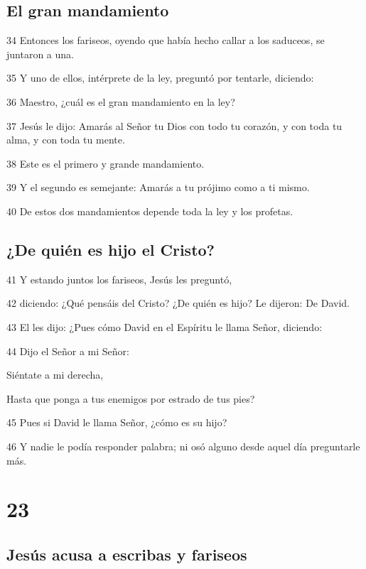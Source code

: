 \section*{El gran mandamiento}

\par 34 Entonces los fariseos, oyendo que había hecho callar a los saduceos, se juntaron a una.
\par 35 Y uno de ellos, intérprete de la ley, preguntó por tentarle, diciendo:
\par 36 Maestro, ¿cuál es el gran mandamiento en la ley?
\par 37 Jesús le dijo: Amarás al Señor tu Dios con todo tu corazón, y con toda tu alma, y con toda tu mente.
\par 38 Este es el primero y grande mandamiento.
\par 39 Y el segundo es semejante: Amarás a tu prójimo como a ti mismo.
\par 40 De estos dos mandamientos depende toda la ley y los profetas.

\section*{¿De quién es hijo el Cristo?}

\par 41 Y estando juntos los fariseos, Jesús les preguntó,
\par 42 diciendo: ¿Qué pensáis del Cristo? ¿De quién es hijo? Le dijeron: De David.
\par 43 El les dijo: ¿Pues cómo David en el Espíritu le llama Señor, diciendo:
\par 44 Dijo el Señor a mi Señor:
\par Siéntate a mi derecha,
\par Hasta que ponga a tus enemigos por estrado de tus pies?
\par 45 Pues si David le llama Señor, ¿cómo es su hijo?
\par 46 Y nadie le podía responder palabra; ni osó alguno desde aquel día preguntarle más.

\chapter{23}

\section*{Jesús acusa a escribas y fariseos}

